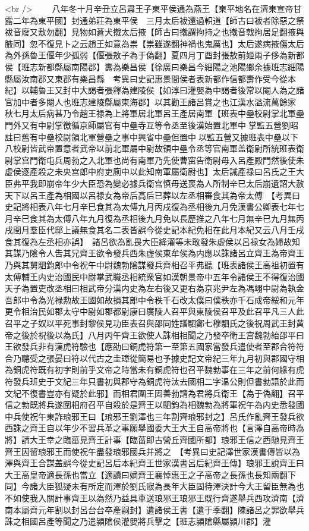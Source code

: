 <br />
　　八年冬十月辛丑立呂肅王子東平侯通為燕王【東平地名在濟東宣帝甘露二年為東平國】封通弟莊為東平侯　三月太后袚還過軹道【師古曰袚者除惡之祭袚音廢又敷勿翻】見物如蒼犬撠太后掖【師古曰撠謂拘持之也撠音戟拘居足翻掖與腋同】忽不復見卜之云趙王如意為祟【祟雖遂翻神禍也鬼厲也】太后遂病掖傷太后為外孫魯王偃年少孤弱【偃張敖子為于偽翻】夏四月丁酉封張敖前姬兩子侈為新都侯【班志新都縣屬南陽郡】夀為樂昌侯【徐廣曰樂昌今細陽之池陽鄉余據班志細陽縣屬汝南郡又東郡有樂昌縣　考異曰史記惠景間侯者表新都作信都夀作受今從本紀】以輔魯王又封中大謁者張釋為建陵侯【如淳曰灌嬰為中謁者後常以閹人為之諸官加中者多閹人也班志建陵縣屬東海郡】以其勸王諸呂賞之也江漢水溢流萬餘家　秋七月太后病甚乃令趙王禄為上將軍居北軍呂王產居南軍【班表中壘校尉掌北軍壘門外又有中尉掌徼循京師屬官有中壘寺互等令丞至後漢始置北軍中掌監五營劉昭註曰舊有中壘校尉領北軍營壘之事中興省中壘但置中以監五營又據班表中壘以下八校尉皆武帝置意者武帝以前北軍屬中尉故領中壘令丞等官南軍盖衛尉所統班表衛尉掌宫門衛屯兵周勃之入北軍也尚有南軍乃先使曹窋告衛尉毋入呂產殿門然後使朱虚侯逐產殺之未央宫郎中府吏廁中以此知南軍屬衛尉也】太后誡產禄曰呂氏之王大臣弗平我即崩帝年少大臣恐為變必據兵衛宫慎毋送喪為人所制辛巳太后崩遺詔大赦天下以呂王產為相國以呂禄女為帝后高后已葬以左丞相審食其為帝太傅　【考異曰史記將相表八年七月辛巳食其為太傅九月丙戌復為丞相後九月免漢書公卿表七年七月辛巳食其為太傅八年九月復為丞相後九月免以長歷推之八年七月無辛巳九月無丙戌閏月羣臣代邸上議無食其名二表皆誤今從史記本紀免相在此月本紀又云八月壬戌食其復為左丞相亦誤】　諸呂欲為亂畏大臣絳灌等未敢發朱虚侯以呂禄女為婦故知其謀乃隂令人吿其兄齊王欲令發兵西朱虚侯東牟侯為内應以誅諸呂立齊王為帝齊王乃與其舅駟鈞郎中令祝午中尉魏勃隂謀發兵齊相召平弗聽【班表諸侯王高祖初置有太傅輔王内史治國民中尉掌武職丞相統衆官如漢朝景帝中五年令諸侯王不得復治國天子為置吏改丞相曰相武帝分漢内史為左右後又更右為京兆尹左為馮翊中尉為執金吾郎中令為光禄勲故王國如故損其郎中令秩千石改太僕曰僕秩亦千石成帝綏和元年更令相治民如郡太守中尉如郡都尉康曰廣陵人召平與東陵侯召平及此召平凡三人此召平之子奴以平死事封黎侯見功臣表召與邵同姓譜駟鄭七穆駟氏之後祝周武王封黄帝之後於祝後以為氏】八月丙午齊王欲使人誅相相聞之乃發卒衛王宫魏勃紿邵平曰王欲發兵非有漢虎符驗也【應劭曰銅虎符第一至第五國家當發兵遣使者至郡合符符合乃聽受之張晏曰符以代古之圭璋從簡易也予據史記文帝紀三年九月初與郡國守相為銅虎符既有初字則前乎文帝之時當未有銅虎符也召平魏勃事在三年之前何緣有虎符發兵班史于文紀三年只書初與郡守為銅虎符汰去國相二字温公則但書勃語於此而文紀不復書豈亦有疑於此邪】而相君圍王固善勃請為君將兵衛王【為于偽翻】召平信之勃既將兵遂圍相府召平自殺於是齊王以駟鈞為相魏勃為將軍祝午為内史悉發國中兵使祝午東詐琅邪王曰【琅邪王劉澤也三年割齊琅邪封之】呂氏作亂齊王發兵欲西誅之齊王自以年少不習兵革之事願舉國委大王大王自高帝將也【言澤自高帝時為將】請大王幸之臨菑見齊王計事【臨菑即古營丘齊國所都】琅邪王信之西馳見齊王齊王因留琅邪王而使祝午盡發琅邪國兵并將之　【考異曰史記澤世家漢書傳皆以為澤與齊王合謀盖誤今從史記呂后本紀齊王世家漢書呂后紀齊王傳】琅邪王說齊王曰大王高皇帝適長孫也當立【適讀曰嫡齊王襄悼惠王之子高帝之長孫也長知兩翻下同】今諸大臣狐疑未有所定而澤於劉氏㝡為長年大臣固待澤決計今大王留臣無為也不如使我入關計事齊王以為然乃益具車送琅邪王琅邪王既行齊遂舉兵西攻濟南【濟南本屬齊元年割以封呂台台卒產嗣封】遺諸侯王書【遺于季翻】陳諸呂之罪欲舉兵誅之相國呂產等聞之乃遣潁隂侯灌嬰將兵擊之【班志潁隂縣屬潁川郡】灌